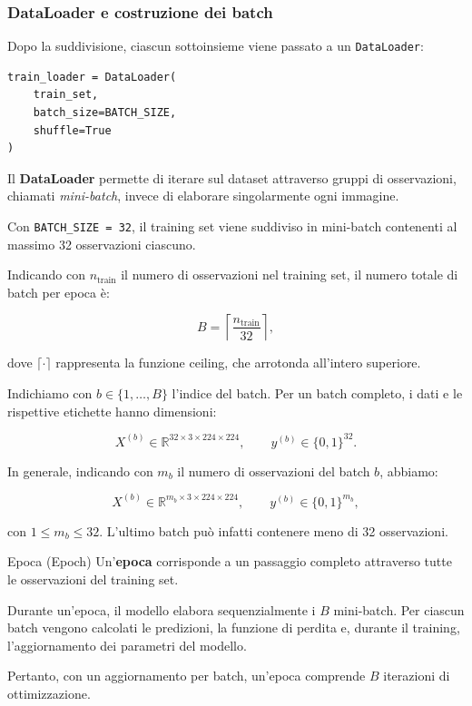 \documentclass[10pt,a4paper,oneside]{book}
\begin{document}
\subsubsection{DataLoader e costruzione dei batch}

Dopo la suddivisione, ciascun sottoinsieme viene passato a un
\texttt{DataLoader}:

\begin{verbatim}
train_loader = DataLoader(
    train_set,
    batch_size=BATCH_SIZE,
    shuffle=True
)
\end{verbatim}

Il \textbf{DataLoader} permette di iterare sul dataset attraverso
gruppi di osservazioni, chiamati \textit{mini-batch}, invece di
elaborare singolarmente ogni immagine.


Con \texttt{BATCH\_SIZE = 32}, il training set viene suddiviso
in mini-batch contenenti al massimo 32 osservazioni ciascuno.

Indicando con $n_{\mathrm{train}}$ il numero di osservazioni
nel training set, il numero totale di batch per epoca è:

\[
B = \left\lceil \frac{n_{\mathrm{train}}}{32} \right\rceil,
\]

dove $\lceil \cdot \rceil$ rappresenta la funzione ceiling,
che arrotonda all'intero superiore.

Indichiamo con $b \in \{1,\ldots,B\}$ l'indice del batch.
Per un batch completo, i dati e le rispettive etichette
hanno dimensioni:

\[
X^{(b)} \in \mathbb{R}^{32 \times 3 \times 224 \times 224},
\qquad
y^{(b)} \in \{0,1\}^{32}.
\]

In generale, indicando con $m_b$ il numero di osservazioni
del batch $b$, abbiamo:

\[
X^{(b)} \in \mathbb{R}^{m_b \times 3 \times 224 \times 224},
\qquad
y^{(b)} \in \{0,1\}^{m_b},
\]

con $1 \leq m_b \leq 32$. L'ultimo batch può infatti
contenere meno di 32 osservazioni.

\begin{definitionbox}{Epoca (Epoch)}
Un'\textbf{epoca} corrisponde a un passaggio completo
attraverso tutte le osservazioni del training set.

Durante un'epoca, il modello elabora sequenzialmente
i $B$ mini-batch. Per ciascun batch vengono calcolati
le predizioni, la funzione di perdita e, durante il training,
l'aggiornamento dei parametri del modello.

Pertanto, con un aggiornamento per batch, un'epoca
comprende $B$ iterazioni di ottimizzazione.
\end{definitionbox}
\end{document}
